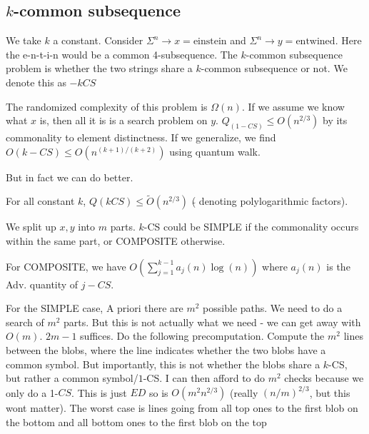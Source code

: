 \subsection*{$k$-common subsequence}
We take $k$ a constant. Consider $\Sigma^n \to x = \text{einstein}$ and $\Sigma^n \to y = \text{entwined}$. Here the e-n-t-i-n would be a common 4-subsequence. The $k$-common subsequence problem is whether the two strings share a $k$-common subsequence or not. We denote this as $-kCS$

The randomized complexity of this problem is $\Omega(n)$. If we assume we know what $x$ is, then all it is is a search problem on $y$. 
$Q_(1-CS) \leq O(n^{2/3})$ by its commonality to element distinctness. If we generalize, we find $O(k-CS) \leq O(n^{(k+1)/(k+2)})$ using quantum walk.

But in fact we can do better.

\begin{propbox}{}
    For all constant $k$, $Q(kCS) \leq \tilde O(n^{2/3})$ ($\tilde{}$ denoting polylogarithmic factors).
\end{propbox}
We split up $x, y$ into $m$ parts. $k$-CS could be SIMPLE if the commonality occurs within the same part, or COMPOSITE otherwise.

For COMPOSITE, we have $O(\sum_{j=1}^{k-1}a_j(n)\log(n))$ where $a_j(n)$ is the Adv. quantity of $j-CS$. 

For the SIMPLE case, A priori there are $m^2$ possible paths. We need to do a search of $m^2$ parts. But this is not actually what we need - we can get away with $O(m)$. $2m-1$ suffices. Do the following precomputation. Compute the $m^2$ lines between the blobs, where the line indicates whether the two blobs have a common symbol. But importantly, this is not whether the blobs share a $k$-CS, but rather a common symbol/$1$-CS. I can then afford to do $m^2$ checks because we only do a 1-$CS$. This is just $ED$ so is $O(m^2n^{2/3})$ (really $(n/m)^{2/3}$, but this wont matter). The worst case is lines going from all top ones to the first blob on the bottom and all bottom ones to the first blob on the top